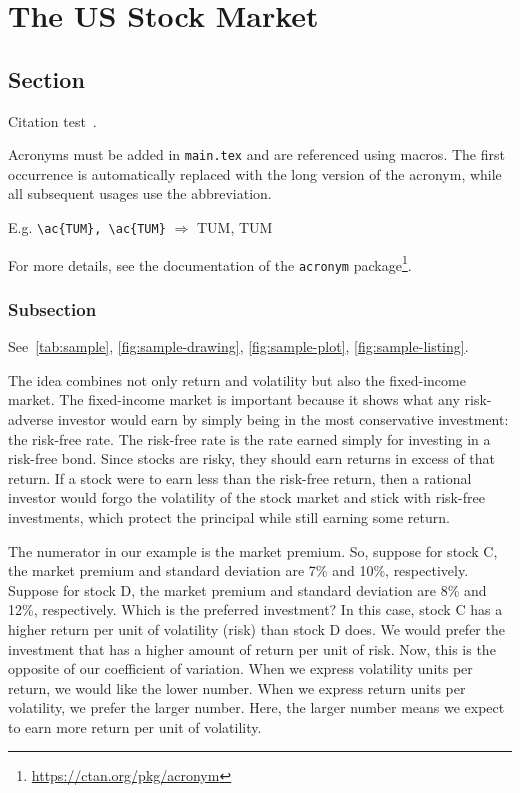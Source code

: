 
\chapter{The US Stock Market}\label{chapter:stock market}

\section{Section}
Citation test~\parencite{latex}.

Acronyms must be added in \texttt{main.tex} and are referenced using macros. The first occurrence is automatically replaced with the long version of the acronym, while all subsequent usages use the abbreviation.

E.g. \texttt{\textbackslash ac\{TUM\}, \textbackslash ac\{TUM\}} $\Rightarrow$ \ac{TUM}, \ac{TUM}

For more details, see the documentation of the \texttt{acronym} package\footnote{\url{https://ctan.org/pkg/acronym}}.
\subsection{Subsection}

See~\autoref{tab:sample}, \autoref{fig:sample-drawing}, \autoref{fig:sample-plot}, \autoref{fig:sample-listing}.

The idea combines not only return and volatility but also the fixed-income market. The fixed-income market is important because it shows what any risk-adverse investor would earn by simply being in the most conservative investment: the risk-free rate. The risk-free rate is the rate earned simply for investing in a risk-free bond. Since stocks are risky, they should earn returns in excess of that return. If a stock were to earn less than the risk-free return, then a rational investor would forgo the volatility of the stock market and stick with risk-free investments, which protect the principal while still earning some return.

The numerator in our example is the market premium. So, suppose for stock C, the market premium and standard deviation are 7\% and 10\%, respectively. Suppose for stock D, the market premium and standard deviation are 8\% and 12\%, respectively. Which is the preferred investment?
In this case, stock C has a higher return per unit of volatility (risk) than stock D does. We would prefer the investment that has a higher amount of return per unit of risk. Now, this is the opposite of our coefficient of variation. When we express volatility units per return, we would like the lower number. When we express return units per volatility, we prefer the larger number. Here, the larger number means we expect to earn more return per unit of volatility.

